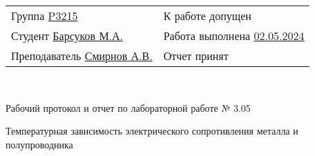 
\thispagestyle{titlepage}
\begin{tabularx}{\textwidth}{XX}
    Группа  \uline{\hfill P3215 
    \hfill} &  К работе допущен  \uline{\hfill \hfill} \\[5pt]
    Студент \uline{\hfill Барсуков М.А.
    \hfill} & Работа выполнена \uline{\hfill 02.05.2024 \hfill} \\[5pt]
    Преподаватель \uline{\hfill Смирнов А.В.
    \hfill} & Отчет принят \uline{\hfill \hfill}
\end{tabularx} \\

\begin{titlemargin}
     Рабочий протокол и отчет по лабораторной работе № 3.05 \\
\end{titlemargin}

\HRule 
\begin{titlemargin}
Температурная зависимость
электрического сопротивления
металла и полупроводника
\end{titlemargin}
\HRule
\clearpage